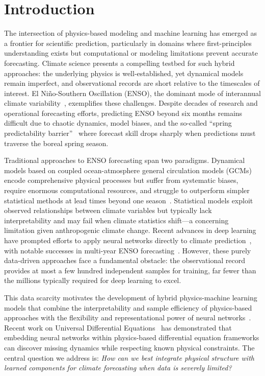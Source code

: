 \section{Introduction}
\label{sec:introduction}

The intersection of physics-based modeling and machine learning has emerged as a frontier for scientific prediction, particularly in domains where first-principles understanding exists but computational or modeling limitations prevent accurate forecasting. Climate science presents a compelling testbed for such hybrid approaches: the underlying physics is well-established, yet dynamical models remain imperfect, and observational records are short relative to the timescales of interest. El Ni\~no-Southern Oscillation (ENSO), the dominant mode of interannual climate variability~\cite{mcphaden2006enso,timmermann2018enso}, exemplifies these challenges. Despite decades of research and operational forecasting efforts, predicting ENSO beyond six months remains difficult due to chaotic dynamics, model biases, and the so-called ``spring predictability barrier''~\cite{webster1995monsoon,duan2013predictability} where forecast skill drops sharply when predictions must traverse the boreal spring season.

Traditional approaches to ENSO forecasting span two paradigms. Dynamical models based on coupled ocean-atmosphere general circulation models (GCMs)~\cite{flato2013evaluation} encode comprehensive physical processes but suffer from systematic biases, require enormous computational resources, and struggle to outperform simpler statistical methods at lead times beyond one season~\cite{barnston2012skill}. Statistical models exploit observed relationships between climate variables but typically lack interpretability and may fail when climate statistics shift---a concerning limitation given anthropogenic climate change. Recent advances in deep learning have prompted efforts to apply neural networks directly to climate prediction~\cite{reichstein2019deep}, with notable successes in multi-year ENSO forecasting~\cite{ham2019deep}. However, these purely data-driven approaches face a fundamental obstacle: the observational record provides at most a few hundred independent samples for training, far fewer than the millions typically required for deep learning to excel.

This data scarcity motivates the development of hybrid physics-machine learning models that combine the interpretability and sample efficiency of physics-based approaches with the flexibility and representational power of neural networks~\cite{willard2022integrating,yin2021augmenting}. Recent work on Universal Differential Equations~\cite{rackauckas2020universal} has demonstrated that embedding neural networks within physics-based differential equation frameworks can discover missing dynamics while respecting known physical constraints. The central question we address is: \emph{How can we best integrate physical structure with learned components for climate forecasting when data is severely limited?}

